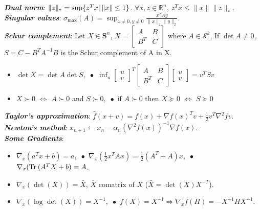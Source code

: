 \documentclass[a4paper, 11pt, twocolumn, landscape]{article}
\theoremstyle{lemma-style}
\theoremstyle{thm-style}
\theoremstyle{prop-style}
\theoremstyle{cor-style}
\newcommand{\Rn}{\mathbb{R}^{n}}
\newcommand{\Sn}{\mathbf{S}^{n}}
\renewcommand{\emph}[1]{\textbf{\textit{#1}}}
\newcommand{\norm}[1]{\|#1\|}
\newcommand{\grad}[1]{\nabla{#1}}
\newcommand{\gradwrt}[2]{\nabla_#1{#2}}
\newcommand{\hess}[1]{\nabla^2{#1}}
\newcommand{\set}[2]{\{ #1 \hspace{.1em} | \hspace{.1em}#2 \}}
\newcommand{\Tr}[1]{\text{Tr}\hspace{0.2em}#1}
\begin{document}
\begin{small}
\emph{Dual norm}: $\norm{z}_* = \sup \set{z^T x}{\norm{x} \le 1}$. $\forall x, z \in \Rn,\ z^T x \le \norm{x} \norm{z}_*$. \\
\emph{Singular values}: $\sigma_{\text{max}}(A) = \sup_{x \ne 0, y \ne 0} \frac{x^T A y}{\norm{x}_2 \norm{y}_2}$. \\
\emph{Schur complement}: Let $X \in \Sn$, $X =
\begin{bmatrix}
    A & B \\
    B^T & C
  \end{bmatrix}$ where $A \in \mathcal{S}^k$, If $\det{A} \ne 0$,
  $S = C - B^T A^{-1} B$ is the Schur complement of A in X.
  \begin{itemize}
  \item $\det{X} = \det{A} \det{S}$, \,\,$\bullet\,$ $\inf_{u} \begin{bmatrix}
    u \\
    v
  \end{bmatrix}^T \begin{bmatrix}
    A & B \\
    B^T & C
  \end{bmatrix} \begin{bmatrix}
    u \\
    v
  \end{bmatrix}  = v^T S v$
\item $X \succ 0$ $\iff$ $A \succ 0$ and $S \succ 0$, \,\,$\bullet\,$ if $A \succ 0$ then $X \succeq 0$ $\iff$ $S \succeq 0$
\end{itemize}

\noindent \emph{Taylor's approximation}: $\hat{f}(x + v) = f(x) + \grad{f}(x)^T v + \frac{1}{2} v^T \hess{f} v$. \\
\emph{Newton's method}: $x_{n+1} \leftarrow x_n - \alpha_n(\hess{f}(x))^{-1} \grad{f}(x)$. \\
\emph{Some Gradients}:
\begin{itemize}
\item $\gradwrt{x}{(a^T x + b)} = a$, \,\,$\bullet\,$ $\gradwrt{x}{(\frac{1}{2}x^T A x)} = \frac{1}{2} (A^T + A) x$, \,\,$\bullet\,$ $\gradwrt{x}{(\Tr(A^T X + b)} = A$.
\item $\gradwrt{x}{(\det(X))} = \bar{X}$, $\bar{X}$ comatrix of $X$ ($\bar{X} = \det(X)X^{-T}$).
\item $\gradwrt{x}{(\log\det(X))} = X^{-1}$, \,\,$\bullet\,$ $f(X) = X^{-1} \Rightarrow \gradwrt{x}{f}(H) = -X^{-1} H X^{-1}$.
\end{itemize}

\end{small}
\end{document}
